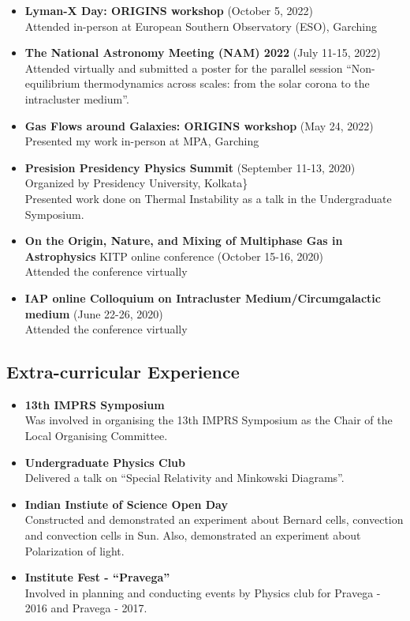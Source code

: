 \documentclass[
  a4paper,
  11pt,
  oneside]{article}
\begin{document}
\begin{itemize}
\item
  \textbf{Lyman-X Day: ORIGINS workshop} (October 5, 2022)\\
  Attended in-person at European Southern Observatory (ESO), Garching
\item
  \textbf{The National Astronomy Meeting (NAM) 2022} (July 11-15,
  2022)\\
  Attended virtually and submitted a poster for the parallel session
  ``Non-equilibrium thermodynamics across scales: from the solar corona
  to the intracluster medium''.
\item
  \textbf{Gas Flows around Galaxies: ORIGINS workshop} (May 24, 2022)\\
  Presented my work in-person at MPA, Garching
\item
  \textbf{Presision Presidency Physics Summit} (September 11-13, 2020)\\
  Organized by Presidency University, Kolkata\}\\
  Presented work done on Thermal Instability as a talk in the
  Undergraduate Symposium.
\item
  \textbf{On the Origin, Nature, and Mixing of Multiphase Gas in
  Astrophysics} KITP online conference (October 15-16, 2020)\\
  Attended the conference virtually
\item
  \textbf{IAP online Colloquium on Intracluster Medium/Circumgalactic
  medium} (June 22-26, 2020)\\
  Attended the conference virtually
\end{itemize}

\hypertarget{extra-curricular-experience}{%
\subsection{Extra-curricular
Experience}\label{extra-curricular-experience}}

\begin{itemize}
\item
  \textbf{13th IMPRS Symposium}\\
  Was involved in organising the 13th IMPRS Symposium as the Chair of
  the Local Organising Committee.
\item
  \textbf{Undergraduate Physics Club}\\
  Delivered a talk on ``Special Relativity and Minkowski Diagrams''.
\item
  \textbf{Indian Instiute of Science Open Day}\\
  Constructed and demonstrated an experiment about Bernard cells,
  convection and convection cells in Sun. Also, demonstrated an
  experiment about Polarization of light.
\item
  \textbf{Institute Fest - ``Pravega''}\\
  Involved in planning and conducting events by Physics club for Pravega
  - 2016 and Pravega - 2017.\\
\end{itemize}
\end{document}
